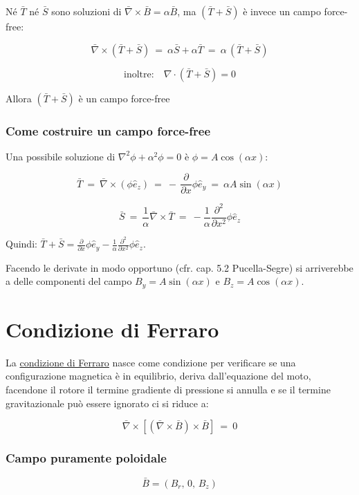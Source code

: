 Né $\bar T$ né $\bar S$ sono soluzioni di $\bar \nabla \times \bar B = \alpha \bar B$, ma $(\bar T+\bar S)$ è invece un campo force-free:

\[\bar \nabla \times (\bar T + \bar S)\ =\ \alpha \bar S + \alpha \bar T\ =\ \alpha\, (\bar T + \bar S)\]

\[\text{inoltre:}\quad \nabla\cdot (\bar T+\bar S)=0\]

Allora $(\bar T + \bar S)$ è un campo force-free


%
%
%
\subsubsection{Come costruire un campo force-free}

Una possibile soluzione di $\nabla^2 \phi + \alpha^2 \phi =0$ è $\phi=A\cos(\alpha x)$:

\[\bar T\ =\ \bar \nabla \times (\phi \hat e_z)\ =\ -\, \frac{\partial}{\partial x} \phi \hat e_y\ =\ \alpha A \sin(\alpha x)\]

\[\bar S\ =\ \frac{1}{\alpha} \bar \nabla \times \bar T\ =\ -\frac{1}{\alpha} \frac{\partial^2}{\partial x^2} \phi \hat e_z\]

Quindi: $\bar T +\bar S = \frac{\partial}{\partial x} \phi \hat e_y -\frac{1}{\alpha} \frac{\partial^2}{\partial x^2} \phi \hat e_z$.

Facendo le derivate in modo opportuno (cfr. cap. 5.2 Pucella-Segre) si arriverebbe a delle componenti del campo $B_y=A\sin(\alpha x)$ e $B_z = A\cos(\alpha x)$.

%
%
%
\section{Condizione di Ferraro}

La \underline{condizione di Ferraro} nasce come condizione per verificare se una configurazione magnetica è in equilibrio, deriva dall'equazione del moto, facendone il rotore il termine gradiente di pressione si annulla e se il termine gravitazionale può essere ignorato ci si riduce a:

\begin{equation} \label{Ferraro}
\bar \nabla \times [(\bar \nabla \times \bar B)\times \bar B]\ =\ 0
\end{equation}

%
%
\vspace{0.5cm}
\subsubsection{Campo puramente poloidale}
\[\bar B = (B_r,\,0,\,B_z)\]

